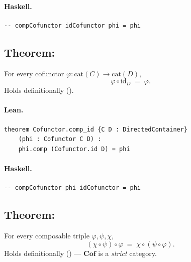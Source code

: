\documentclass[11pt,a4paper]{article}
\begin{document}
\paragraph{Haskell.}
\begin{lstlisting}[style=haskell]
-- compCofunctor idCofunctor phi = phi
\end{lstlisting}


\subsection{Theorem: }

\begin{thm}
For every cofunctor $\varphi : \mathrm{cat}(C) \to \mathrm{cat}(D)$,
\[
  \varphi \circ \mathrm{id}_D \;=\; \varphi.
\]
Holds definitionally ().
\end{thm}

\paragraph{Lean.}
\begin{lstlisting}[style=lean]
theorem Cofunctor.comp_id {C D : DirectedContainer}
    (phi : Cofunctor C D) :
    phi.comp (Cofunctor.id D) = phi
\end{lstlisting}

\paragraph{Haskell.}
\begin{lstlisting}[style=haskell]
-- compCofunctor phi idCofunctor = phi
\end{lstlisting}


\subsection{Theorem: }

\begin{thm}
For every composable triple $\varphi, \psi, \chi$,
\[
  (\chi \circ \psi) \circ \varphi \;=\; \chi \circ (\psi \circ \varphi).
\]
Holds definitionally () --- $\mathbf{Cof}$ is a \emph{strict}
category.
\end{thm}
\end{document}
